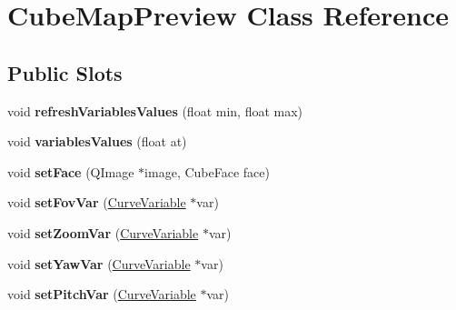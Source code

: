 \hypertarget{class_cube_map_preview}{
\section{\-Cube\-Map\-Preview \-Class \-Reference}
\label{class_cube_map_preview}
}
\subsection*{\-Public \-Slots}
\begin{DoxyCompactItemize}
\item 
\hypertarget{class_cube_map_preview_ab1dcb92453c0da7a833a7bf23864fd6a}{
void {\bfseries refresh\-Variables\-Values} (float min, float max)}
\label{class_cube_map_preview_ab1dcb92453c0da7a833a7bf23864fd6a}

\item 
\hypertarget{class_cube_map_preview_aa4fb2597e09a81469148c5eb40d9c311}{
void {\bfseries variables\-Values} (float at)}
\label{class_cube_map_preview_aa4fb2597e09a81469148c5eb40d9c311}

\item 
\hypertarget{class_cube_map_preview_ad1a8eb929f93eed44b744c3198dcbacf}{
void {\bfseries set\-Face} (\-Q\-Image $\ast$image, \-Cube\-Face face)}
\label{class_cube_map_preview_ad1a8eb929f93eed44b744c3198dcbacf}

\item 
\hypertarget{class_cube_map_preview_a791dfa44837f6b9893399f4fb75d441a}{
void {\bfseries set\-Fov\-Var} (\hyperlink{class_curve_variable}{\-Curve\-Variable} $\ast$var)}
\label{class_cube_map_preview_a791dfa44837f6b9893399f4fb75d441a}

\item 
\hypertarget{class_cube_map_preview_ae17de4ff3788263c73ae0232a025cfb3}{
void {\bfseries set\-Zoom\-Var} (\hyperlink{class_curve_variable}{\-Curve\-Variable} $\ast$var)}
\label{class_cube_map_preview_ae17de4ff3788263c73ae0232a025cfb3}

\item 
\hypertarget{class_cube_map_preview_a070c10dfdb34637440969768fd727e30}{
void {\bfseries set\-Yaw\-Var} (\hyperlink{class_curve_variable}{\-Curve\-Variable} $\ast$var)}
\label{class_cube_map_preview_a070c10dfdb34637440969768fd727e30}

\item 
\hypertarget{class_cube_map_preview_a3811333d7804a01f90a61f0d606152bb}{
void {\bfseries set\-Pitch\-Var} (\hyperlink{class_curve_variable}{\-Curve\-Variable} $\ast$var)}
\label{class_cube_map_preview_a3811333d7804a01f90a61f0d606152bb}


\end{DoxyCompactItemize}
